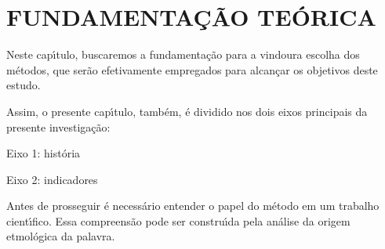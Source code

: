 \documentclass[
12pt,		%
openright,	%
twoside,  %
a4paper,			%
chapter=TITLE,		%
english,			%
french,				%
spanish,			%
brazil				%
]{USPSC-classe/USPSC}
\begin{document}
\chapter[FUNDAMENTA\c{C}\~AO TE\'ORICA ]{FUNDAMENTA\c{C}\~AO TE\'ORICA }\label{FUNDAMENTA\c{C}\~AO TE\'ORICA }
Neste cap\'{\i}tulo, buscaremos a fundamenta\c{c}\~ao para a vindoura escolha dos m\'etodos, que ser\~ao efetivamente empregados para alcan\c{c}ar os objetivos deste estudo.

















Assim, o presente cap\'{\i}tulo, tamb\'em, \'e dividido nos dois eixos principais da presente investiga\c{c}\~ao:


















\begin{alineas}
\item Eixo 1: hist\'oria
\item Eixo 2: indicadores
\end{alineas}

Antes de prosseguir \'e necess\'ario entender o papel do m\'etodo em um trabalho cient\'{\i}fico. Essa compreens\~ao pode ser constru\'{\i}da pela an\'alise da origem etmol\'ogica da palavra.


















\noindent\begin{center}\mbox{\centering{}}\end{center}
\end{document}
